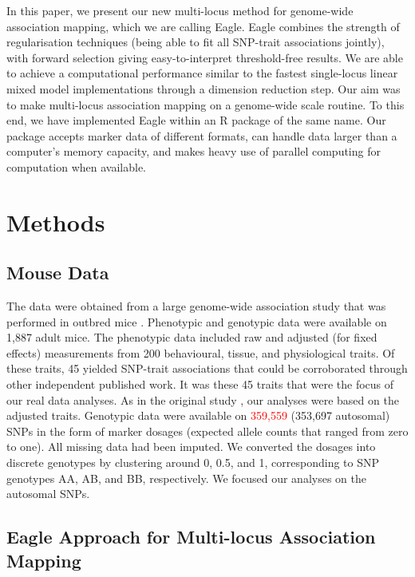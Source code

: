 \documentclass{bioinfo}
\begin{document}
In this paper, we present our new multi-locus method for genome-wide association mapping, which we are calling Eagle. 
Eagle combines the strength of regularisation techniques (being able to fit all SNP-trait associations jointly), with forward selection giving easy-to-interpret threshold-free results.   We are able to achieve a computational performance similar to the fastest single-locus linear mixed model implementations 
through a dimension reduction step.
Our aim was to make multi-locus association mapping on a genome-wide scale routine. To this end, we have implemented Eagle 
within an R package of the same name. 
Our package accepts marker data of different 
formats,  can handle data larger than a computer's  memory capacity, and makes heavy use of 
parallel computing for computation when available.  










\section{Methods}

\subsection{Mouse Data}

The data were obtained from a large genome-wide association study that was performed in outbred mice \citep{nicod2016genome}. 
Phenotypic and genotypic data were available on 1,887 adult mice. 
The phenotypic data included raw and adjusted (for fixed effects) measurements from 200 behavioural, tissue, and physiological traits.  
Of these traits, 
45 yielded SNP-trait associations that could be corroborated through other independent published work. It was these 
45 traits that were the focus of our real data analyses. As in the original study  \citep{nicod2016genome}, our analyses 
were based on the adjusted traits.
Genotypic data were available on \textcolor{red}{359,559} (353,697 autosomal) SNPs in the 
form of marker dosages (expected allele counts that ranged from zero to one). All missing data had been imputed. 
We converted the dosages into discrete genotypes 
by clustering around 0, 0.5, and 1, corresponding to SNP genotypes AA, AB, and BB, respectively. 
We focused our analyses on the autosomal SNPs.




\subsection{Eagle Approach for Multi-locus Association Mapping}
\label{subsection:Eagle}
\end{document}
